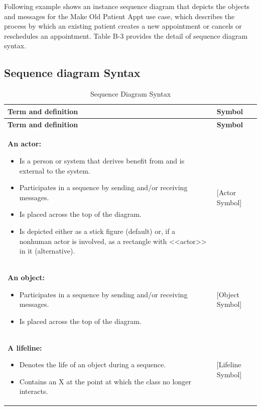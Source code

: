 \documentclass[12pt,a4paper]{report}
\begin{document}
Following example shows an instance sequence diagram that depicts the objects and messages for the Make Old Patient Appt use case, which describes the process by which an existing patient creates a new appointment or cancels or reschedules an appointment. Table B-3 provides the detail of sequence diagram syntax.

\subsection*{Sequence diagram Syntax}

\begin{longtable}{|p{8cm}|p{4cm}|}
\caption{Sequence Diagram Syntax} \label{tab:sequence} \\
\hline
\textbf{Term and definition} & \textbf{Symbol} \\
\hline
\endfirsthead
\hline
\textbf{Term and definition} & \textbf{Symbol} \\
\hline
\endhead

\textbf{An actor:} \newline
\begin{itemize}
    \item Is a person or system that derives benefit from and is external to the system.
    \item Participates in a sequence by sending and/or receiving messages.
    \item Is placed across the top of the diagram.
    \item Is depicted either as a stick figure (default) or, if a nonhuman actor is involved, as a rectangle with <<actor>> in it (alternative).
\end{itemize} & [Actor Symbol] \\
\hline

\textbf{An object:} \newline
\begin{itemize}
    \item Participates in a sequence by sending and/or receiving messages.
    \item Is placed across the top of the diagram.
\end{itemize} & [Object Symbol] \\
\hline

\textbf{A lifeline:} \newline
\begin{itemize}
    \item Denotes the life of an object during a sequence.
    \item Contains an X at the point at which the class no longer interacts.
\end{itemize} & [Lifeline Symbol] \\
\hline


\end{longtable}
\end{document}
